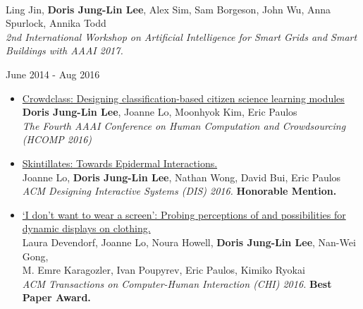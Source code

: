 \documentclass{res}
\begin{document}
\begin{resume}
\begin{itemize}[leftmargin=0.3em]
    \\ {\footnotesize Ling Jin, \textbf{Doris Jung-Lin Lee}, Alex Sim, Sam Borgeson, John Wu, Anna Spurlock, Annika Todd
    \vspace{-5pt}
    \\  \textit{2nd International Workshop on Artificial Intelligence for Smart Grids and Smart Buildings with AAAI 2017.}}
     \vspace{-10pt}
    \end{itemize}
\vspace{5pt}
\hspace{-10pt}{\normalsize\bf UC Berkeley Hybrid Ecologies Lab} \hspace{188pt}  June 2014 - Aug 2016 
   \begin{itemize}[leftmargin=0.3em]
   \item \href{http://aaai.org/ocs/index.php/HCOMP/HCOMP16/paper/viewFile/14027/13638}{Crowdclass: Designing classification-based citizen science learning modules}
   \\ {\footnotesize \textbf{Doris Jung-Lin Lee}, Joanne Lo, Moonhyok Kim, Eric Paulos
   \vspace{-5pt}
   \\ \textit{The Fourth AAAI Conference on Human Computation and Crowdsourcing (HCOMP 2016)}}
   \item \href{http://dl.acm.org/citation.cfm?id=2901885&CFID=765226474&CFTOKEN=46922780}{Skintillates: Towards Epidermal Interactions.}
   \\ {\footnotesize Joanne Lo, \textbf{Doris Jung-Lin Lee}, Nathan Wong, David Bui, Eric Paulos
   \vspace{-5pt}
   \\ \textit{ACM Designing Interactive Systems (DIS) 2016.} \textbf{Honorable Mention.}}
   \item \href{http://dl.acm.org/citation.cfm?id=2858192&CFID=765226474&CFTOKEN=46922780}{`I don't want to wear a screen': Probing perceptions of and  possibilities for dynamic displays on clothing.}
   \\ {\footnotesize Laura Devendorf, Joanne Lo, Noura Howell, \textbf{Doris Jung-Lin Lee}, Nan-Wei Gong,
   \vspace{-2pt}
   \\ M. Emre Karagozler, Ivan  Poupyrev, Eric Paulos, Kimiko Ryokai
   \vspace{-5pt}
   \\ \textit{ACM Transactions on Computer-Human Interaction (CHI) 2016.} \textbf{Best Paper Award.}}
   \end{itemize}

\end{resume}
\end{document}

